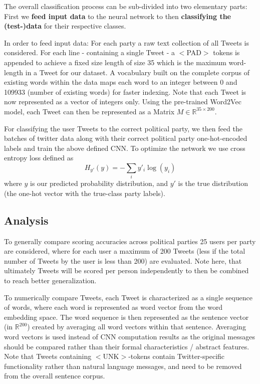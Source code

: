 \documentclass[10pt, oneside]{article}
\begin{document}
\begin{multicols}{2}
The overall classification process can be sub-divided into two elementary parts: First we \textbf{feed input data} to the neural network to then \textbf{classifying the (test-)data} for their respective classes.

In order to feed input data: For each party a raw text collection of all Tweets is considered. For each line - containing a single Tweet - a $<$PAD$>$ tokens is appended to achieve a fixed size length of size 35 which is the maximum word-length in a Tweet for our dataset.  A vocabulary built on the complete corpus of existing words within the data maps each word to an integer between 0 and 109933 (number of existing words) for faster indexing.
Note that each Tweet is now represented as a vector of integers only. Using the pre-trained Word2Vec model, each Tweet can then be represented as a Matrix $M \in \mathbb{R}^{35 \times 200}$.

For classifying the user Tweets to the correct political party, we then feed the batches of twitter data along with their correct political party one-hot-encoded labels and train the above defined CNN. To optimize the network we use cross entropy loss defined as
\begin{equation*}
	H_{y'}(y) = - \sum_{i} y'_{i} \log (y_{i})
\end{equation*}
where $y$ is our predicted probability distribution, and $y'$ is the true distribution (the one-hot vector with the true-class party labels). 

\subsection{Analysis}\label{subsec:methodAnalysis}

To generally compare scoring accuracies across political parties 25 users per party are considered, where for each user a maximum of 200 Tweets (less if the total number of Tweets by the user is less than 200) are evaluated. Note here, that ultimately Tweets will be scored per person independently to then be combined to reach better generalization.

To numerically compare Tweets, each Tweet is characterized as a single sequence of words, where each word is represented as word vector from the word embedding space. The word sequence is then represented as the sentence vector (in $\mathbb{R}^{200}$) created by averaging all word vectors within that sentence.
Averaging word vectors is used instead of CNN computation results as the original messages should be compared rather than their formal characteristics / abstract features.
Note that Tweets containing $<$UNK$>$-tokens contain Twitter-specific functionality rather than natural language messages, and need to be removed from the overall sentence corpus.


\end{multicols}
\end{document}
